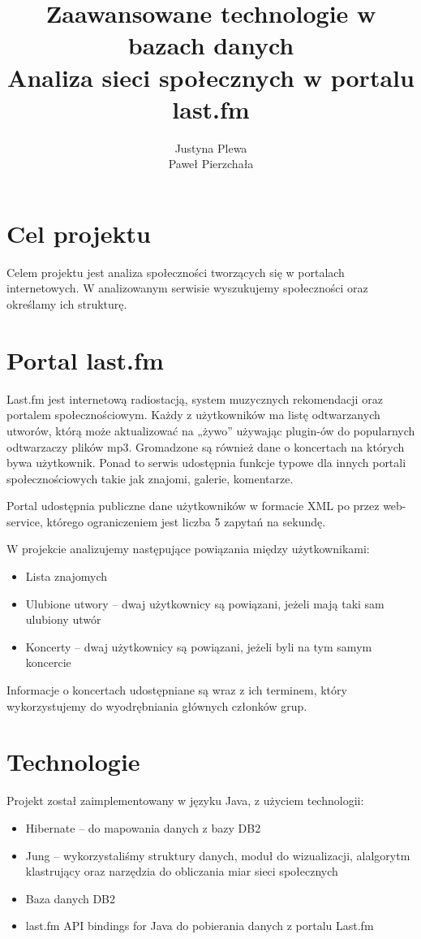 \documentclass[10pt,a4paper]{article}
\title{Zaawansowane technologie w bazach danych\\
Analiza sieci społecznych w portalu last.fm}
\author{  Justyna Plewa \\ Paweł Pierzchała  }
\begin{document}
\maketitle



\newpage

\section {Cel projektu}
Celem projektu jest analiza społeczności tworzących się w portalach internetowych. W analizowanym serwisie wyszukujemy społeczności oraz określamy ich strukturę. 

\section {Portal last.fm}
Last.fm jest internetową radiostacją, system muzycznych rekomendacji oraz portalem społecznościowym. Każdy z użytkowników ma listę odtwarzanych utworów, którą może aktualizować na „żywo” używając plugin-ów do popularnych odtwarzaczy plików mp3. Gromadzone są również dane o koncertach na których bywa użytkownik. Ponad to serwis udostępnia funkcje typowe dla innych portali społecznościowych takie jak znajomi, galerie, komentarze.

Portal udostępnia publiczne dane użytkowników w formacie XML po przez web-service, którego ograniczeniem jest liczba 5 zapytań na sekundę.

W projekcie analizujemy następujące powiązania między użytkownikami:
\begin{itemize}
\item Lista znajomych
\item Ulubione utwory – dwaj użytkownicy są powiązani, jeżeli mają taki sam ulubiony utwór
\item Koncerty – dwaj użytkownicy są powiązani, jeżeli byli na tym samym koncercie
\end{itemize}
Informacje o koncertach udostępniane są wraz z ich terminem, który wykorzystujemy do wyodrębniania głównych członków grup.


\section {Technologie}
Projekt został zaimplementowany w języku Java, z użyciem technologii:

\begin{itemize}
\item Hibernate – do mapowania danych z bazy DB2
\item Jung – wykorzystaliśmy struktury danych, moduł do wizualizacji, alalgorytm klastrujący oraz narzędzia do obliczania miar sieci społecznych
\item Baza danych DB2
\item last.fm API bindings for Java do pobierania danych z portalu Last.fm
\end{itemize}
\end{document}
